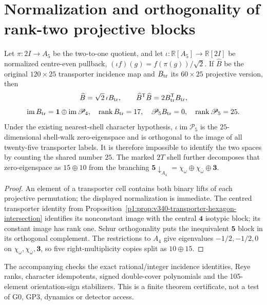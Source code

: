 \documentclass[11pt,a4paper]{article}
\begin{document}
\section{Normalization and orthogonality of rank-two projective blocks}
\label{p2f:sec:v340-projective-binary-certificate}
\begin{proposition}
\label{p2f:prop:v340-projective-binary-orthogonality}
Let $\pi:2I\to A_5$ be the two-to-one quotient, and let
$\iota:\mathbb R[A_5]\to\mathbb R[2I]$ be normalized centre-even
pullback, $(\iota f)(g)=f(\pi(g))/\sqrt2$. If $\widehat B$
be the original $120\times25$ transporter incidence map and
$B_{\rm tr}$ its $60\times25$ projective version, then
\[
 \widehat B=\sqrt2\,\iota B_{\rm tr},\qquad
 \widehat B^{\mathsf T}\widehat B=2B_{\rm tr}^{\mathsf T}B_{\rm tr},
\]
\[
 \operatorname{im}B_{\rm tr}
 =\mathbf1\oplus\operatorname{im}\mathscr P_4,
 \quad \operatorname{rank} B_{\rm tr}=17,\quad
 \mathscr P_5B_{\rm tr}=0,
 \quad \operatorname{rank}\mathscr P_5=25.
\]
Under the existing nearest-shell character hypothesis,
$\iota\operatorname{im}\mathscr P_5$ is the
$25$-dimensional shell-walk zero-eigenspace and is orthogonal
to the image of all twenty-five transporter labels. It is therefore
impossible to identify the two spaces by counting the shared number
$25$. The marked $2T$ shell further decomposes that zero-eigenspace
as $15\oplus10$ from the branching
$\mathbf5\downarrow_{A_4}
=\chi_\omega\oplus\chi_{\bar\omega}\oplus\mathbf3$.
\end{proposition}
\begin{proof}
An element of a transporter cell contains both binary lifts of
each projective permutation; the displayed normalization is
immediate. The centred transporter identity from
Proposition~\ref{p1:prop:v340-transporter-hexagon-intersection}
identifies its nonconstant image with the central $\mathbf4$
isotypic block; its constant image has rank one. Schur
orthogonality puts the inequivalent $\mathbf5$ block in its
orthogonal complement. The restrictions to $A_4$ give eigenvalues
$-1/2,-1/2,0$ on $\chi_\omega,\chi_{\bar\omega},\mathbf3$,
so five right-multiplicity copies split as $10\oplus15$.
\end{proof}
\begin{remark}
\label{p2f:rem:v340-ranktwo-proof-scope}
The accompanying  checks
the exact rational/integer incidence identities, Reye ranks,
character idempotents, signed double-cover polynomials and the
105-element orientation-sign stabilizers. This is a finite theorem
certificate, not a test of G0, GP3, dynamics or detector access.
\end{remark}
\end{document}
